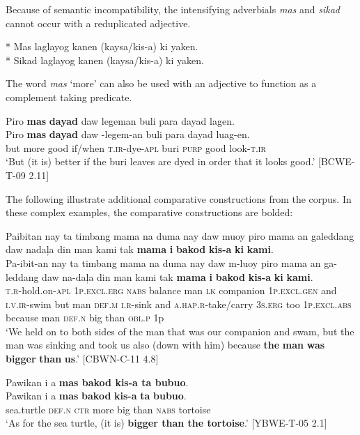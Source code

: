 Because of semantic incompatibility, the intensifying adverbials \textit{mas} and \textit{sikad} cannot occur with a reduplicated adjective.

\ea
* Mas laglayog kanen (kaysa/kis-a) ki yaken. \\
* Sikad laglayog kanen (kaysa/kis-a) ki yaken.
\z

The word \textit{mas} ‘more’ can also be used with an adjective to function as a complement taking predicate.

\ea 
Piro  \textbf{mas}  \textbf{dayad}  daw  legeman  buli  para  dayad  lagen. \\\smallskip
\gll Piro  \textbf{mas}  \textbf{dayad}  daw  \emptyset{}-legem-an  buli  para  dayad  luag-en. \\
but  more  good  if/when  \textsc{t.ir}-dye-\textsc{apl}  buri  \textsc{purp}  good  look-\textsc{t.ir} \\
\glt ‘But (it is) better if the buri leaves are dyed in order that it looks good.’ [BCWE-T-09 2.11]
\z

The following illustrate additional comparative constructions from the corpus. In these complex examples, the comparative constructions are bolded:

\ea
Paibitan  nay  ta  timbang  mama  na  duma  nay daw  muoy  piro  mama  an  galeddang  daw  nadaļa  din  man kami  tak  \textbf{mama}  \textbf{i}  \textbf{bakod}  \textbf{kis-a}  \textbf{ki}  \textbf{kami}. \\\smallskip \gll Pa-ibit-an  nay  ta  timbang  mama  na  duma  nay daw  m-luoy  piro  mama  an  ga-leddang  daw  na-daļa  din  man kami  tak  \textbf{mama}  \textbf{i}  \textbf{bakod}  \textbf{kis-a}  \textbf{ki}  \textbf{kami}. \\
\textsc{t.r}-hold.on-\textsc{apl}  1\textsc{p.excl.erg}  \textsc{nabs}  balance  man  \textsc{lk}  companion  1\textsc{p.excl.gen}
and  \textsc{i.v.ir}-swim  but  man  \textsc{def.m}  \textsc{i.r}-sink  and  \textsc{a.hap.r}-take/carry  3\textsc{s.erg}  too
1\textsc{p.excl.abs}  because  man  \textsc{def.n}  big  than  \textsc{obl.p}  1p \\
\glt ‘We held on to both sides of the man that was our companion and swam, but the man was sinking and took us also (down with him) because \textbf{the} \textbf{man} \textbf{was} \textbf{bigger} \textbf{than} \textbf{us}.’ [CBWN-C-11 4.8]
\z

\ea
Pawikan  i  a  \textbf{mas  bakod  kis-a  ta  bubuo}. \\\smallskip \gll Pawikan  i  a  \textbf{mas}  \textbf{bakod}  \textbf{kis-a}  \textbf{ta}  \textbf{bubuo}. \\
sea.turtle  \textsc{def.n}  \textsc{ctr}  more  big  than  \textsc{nabs}  tortoise \\
\glt ‘As for the sea turtle, (it is) \textbf{bigger than the tortoise}.’ [YBWE-T-05 2.1]
\z

